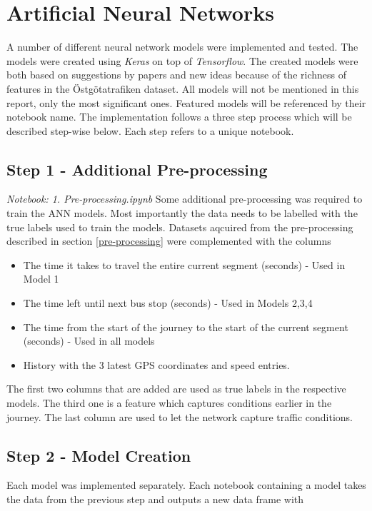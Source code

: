 \section{Artificial Neural Networks}
A number of different neural network models were implemented and tested. The models were created using \textit{Keras} on top of \textit{Tensorflow}. The created models were both based on suggestions by papers and new ideas because of the richness of features in the Östgötatrafiken dataset. All models will not be mentioned in this report, only the most significant ones. Featured models will be referenced by their notebook name. The implementation follows a three step process which will be described step-wise below. Each step refers to a unique notebook.

\subsection{Step 1 - Additional Pre-processing}
\textit{Notebook: 1. Pre-processing.ipynb}
\newline
Some additional pre-processing was required to train the ANN models. Most importantly the data needs to be labelled with the true labels used to train the models. Datasets aqcuired from the pre-processing described in section \ref{pre-processing} were complemented with the columns

\begin{itemize}
    \item The time it takes to travel the entire current segment (seconds) - Used in Model 1
    \item The time left until next bus stop (seconds) - Used in Models 2,3,4
    \item The time from the start of the journey to the start of the current segment (seconds) - Used in all models
    \item History with the 3 latest GPS coordinates and speed entries.
\end{itemize}

\noindent The first two columns that are added are used as true labels in the respective models. The third one is a feature which captures conditions earlier in the journey. The last column are used to let the network capture traffic conditions.

\subsection{Step 2 - Model Creation}
Each model was implemented separately. Each notebook containing a model takes the data from the previous step and outputs a new data frame with 

